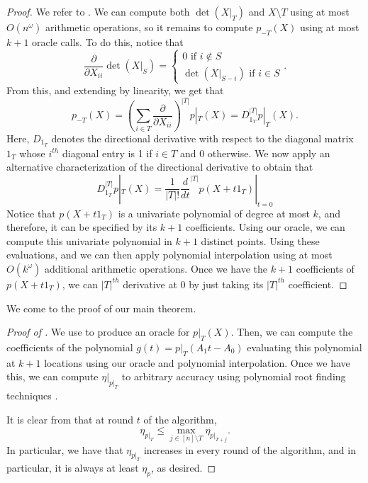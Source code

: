 \documentclass{amsart}
\theoremstyle{definition}
\begin{document}
\begin{proof}
    We refer to .
    We can compute both $\det(X|_T)$ and $X \setminus T$ using at most $O(n^{\omega})$ arithmetic operations, so it remains to compute $p_{-T}(X)$ using at most $k+1$ oracle calls. To do this, notice that
    \[
        \frac{\partial }{\partial X_{ii}} \det(X|_S) = \begin{cases} 0 \text{ if }i \not \in S\\ \det(X|_{S - i}) \text{ if } i \in S \end{cases}.
    \]
    From this, and extending by linearity, we get that
    \[
    p_{-T}(X) =  (\sum_{i \in T} \frac{\partial}{\partial X_{ii}})^{|T|} p|_T(X) = D_{1_{T}}^{|T|} p|_T(X).
    \]
    Here, $D_{1_{T}}$ denotes the directional derivative with respect to the diagonal matrix $1_T$ whose $i^{th}$ diagonal entry is 1 if $i \in T$ and 0 otherwise.
    We now apply an alternative characterization of the directional derivative to obtain that
    \[
    D_{1_T}^{|T|} p|_T(X) = \frac{1}{|T|!}\frac{d}{dt}^{|T|}p(X + t 1_T)|_{t = 0}
    \]
    Notice that $p(X + t 1_T)$ is a univariate polynomial of degree at most $k$, and therefore, it can be specified by its $k+1$ coefficients.
    Using our oracle, we can compute this univariate polynomial in $k+1$ distinct points.
    Using these evaluations, and we can then apply polynomial interpolation using at most $O(k^{\omega})$ additional arithmetic operations.
    Once we have the $k+1$ coefficients of $p(X+t1_T)$, we can $|T|^{th}$ derivative at 0 by just taking its $|T|^{th}$ coefficient.
\end{proof}
We come to the proof of our main theorem.
\begin{proof}[Proof of ]
    We use  to produce an oracle for $p|_T(X)$.
    Then, we can compute the coefficients of the polynomial $g(t) = p|_T(A_1 t - A_0)$ evaluating this polynomial at $k+1$ locations using our oracle and polynomial interpolation.
    Once we have this, we can compute $\eta|_{p|_T}$ to arbitrary accuracy using polynomial root finding techniques \cite{pinkert1976exact,ben1988fast}.

    It is clear from  that at round $t$ of the algorithm,
    \[
        \eta_{p|_T} \le \max_{j \in [n] \setminus T} \eta_{p|_{T+j}}.
    \]
    In particular, we have that $\eta_{p|_T}$ increases in every round of the algorithm, and in particular, it is always at least $\eta_p$, as desired.
\end{proof}
\end{document}
